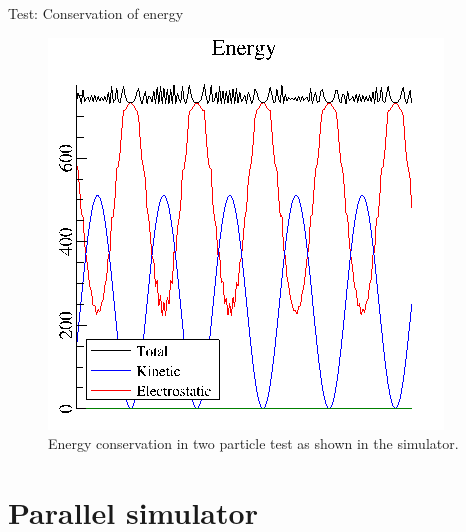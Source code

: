 \documentclass{beamer}
\begin{document}
\begin{frame}{Test: Conservation of energy}{}
\begin{figure}[h]
	\centering
	\includegraphics[width=0.4\linewidth]{1d-2particles-energy.png}
	\caption{Energy conservation in two particle test as shown in the simulator.}
	\label{fig:1d-2particles-energy}
\end{figure}
\end{frame}

\section{Parallel simulator}
\end{document}

